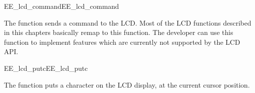 \begin{function_nopb2}{EE\_lcd\_command}{EE_lcd_command}
  
  \begin{fundescription}
    The function sends a command to the LCD. Most of the LCD functions
    described in this chapters basically remap to this function. The
    developer can use this function to implement features which are
    currently not supported by the LCD API.
  \end{fundescription}
  
  \begin{funparameters}
  \end{funparameters}
  
  
\end{function_nopb2}

\begin{function_nopb2}{EE\_lcd\_putc}{EE_lcd_putc}
  
  \begin{fundescription}
    The function puts a character on the LCD display, at the current
    cursor position.
  \end{fundescription}
  
  
  
\end{function_nopb2}

